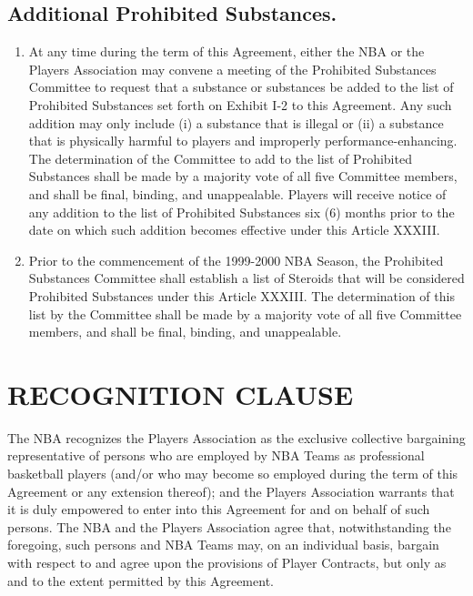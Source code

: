 \documentclass[
]{book}
\providecommand{\tightlist}{%
  \setlength{\itemsep}{0pt}\setlength{\parskip}{0pt}}
\begin{document}
\hypertarget{additional-prohibited-substances.}{%
\section{Additional Prohibited Substances.}\label{additional-prohibited-substances.}}

\begin{enumerate}
\def\labelenumi{(\alph{enumi})}
\tightlist
\item
  At any time during the term of this Agreement, either the NBA or the Players Association may convene a meeting of the Prohibited Substances Committee to request that a substance or substances be added to the list of Prohibited Substances set forth on Exhibit I-2 to this Agreement. Any such addition may only include (i) a substance that is illegal or (ii) a substance that is physically harmful to players and improperly performance-enhancing. The determination of the Committee to add to the list of Prohibited Substances shall be made by a majority vote of all five Committee members, and shall be final, binding, and unappealable. Players will receive notice of any addition to the list of Prohibited Substances six (6) months prior to the date on which such addition becomes effective under this Article XXXIII.
\item
  Prior to the commencement of the 1999-2000 NBA Season, the Prohibited Substances Committee shall establish a list of Steroids that will be considered Prohibited Substances under this Article XXXIII. The determination of this list by the Committee shall be made by a majority vote of all five Committee members, and shall be final, binding, and unappealable.
\end{enumerate}

\hypertarget{recognition-clause}{%
\chapter{RECOGNITION CLAUSE}\label{recognition-clause}}

The NBA recognizes the Players Association as the exclusive collective bargaining representative of persons who are employed by NBA Teams as professional basketball players (and/or who may become so employed during the term of this Agreement or any extension thereof); and the Players Association warrants that it is duly empowered to enter into this Agreement for and on behalf of such persons. The NBA and the Players Association agree that, notwithstanding the foregoing, such persons and NBA Teams may, on an individual basis, bargain with respect to and agree upon the provisions of Player Contracts, but only as and to the extent permitted by this Agreement.
\end{document}
